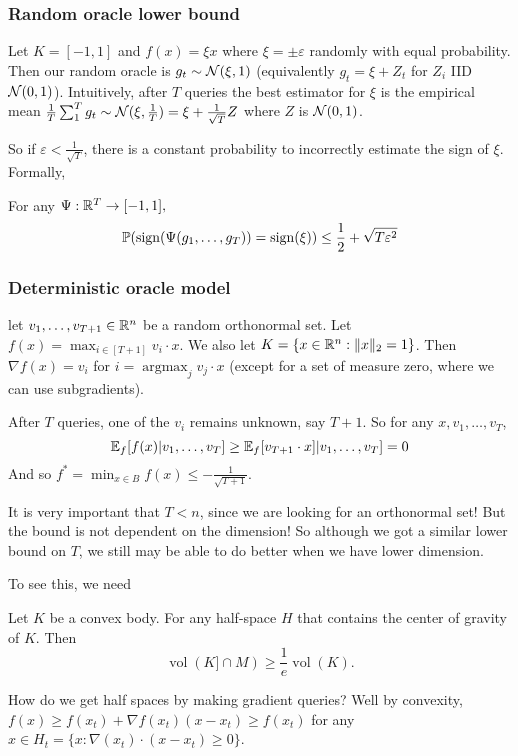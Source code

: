 \documentclass[12pt]{article}
\DeclareMathOperator*{\argmax}{argmax}
\begin{document}
\subsubsection{Random oracle lower bound} 
Let $K=[-1,1]$ and $f(x)=\xi x$ where $\xi=\pm\varepsilon$ randomly with equal probability.
Then our random oracle is $g_t\sim \mathcal{N}(\xi,1)$ (equivalently $g_t=\xi+Z_t$ for $Z_i$ IID $\mathcal{N}(0,1)$). Intuitively, after $T$ queries the best estimator for $\xi$ is the 
empirical mean $\frac{1}{T}\sum_1^T g_t\sim\mathcal{N}(\xi,\frac{1}{T})=\xi+\frac{1}{\sqrt{T}}Z$ where $Z$ is $\mathcal{N}(0,1)$.

So if $\varepsilon<\frac{1}{\sqrt{T}}$, there is a constant probability to incorrectly estimate the sign of $\xi$. Formally,
\begin{lem}
	For any $\Psi:\mathbb{R}^T\to [-1,1],$
	\[\mathbb{P}(\operatorname{sign}(\Psi(g_1,\dots,g_T))=\operatorname{sign}(\xi))\le\frac{1}{2}+\sqrt{T\varepsilon^2}\]
\end{lem}

\subsubsection{Deterministic oracle model} 
let $v_1,\dots,v_{T+1}\in\mathbb{R}^n$ be a random orthonormal set. Let $f(x)=\max_{i\in[T+1]}v_i\cdot x$. We also let $K=\{x\in\mathbb{R}^n:\|x\|_2=1\}$. 
Then $\nabla f(x)=v_i$ for $i=\argmax_{j} v_j\cdot x$ (except for a set of measure zero, where we can use subgradients).

After $T$ queries, one of the $v_i$ remains unknown, say $T+1$. So for any $x, v_1,\dots, v_T$,
\[\mathbb{E}_f[f(x)|v_1,\dots,v_T]\ge\mathbb{E}_f[v_{T+1}\cdot x]|v_1,\dots,v_T]=0\]
And so $f^\ast=\min_{x\in B}f(x)\le-\frac{1}{\sqrt{T+1}}$. 
\begin{rmk}
	It is very important that $T<n$, since we are looking for an orthonormal set! But the bound is not dependent on the dimension! So although we got a similar lower bound on $T$, 
	we still may be able to do better when we have lower dimension.
\end{rmk}

To see this, we need 
\begin{prop}
Let $K$ be a convex body. For any half-space $H$ that contains the center of gravity of $K$. Then 
\[\operatorname{vol}(K]\cap M)\ge\frac{1}{e}\operatorname{vol}(K).\]
\end{prop}

How do we get half spaces by making gradient queries? Well by convexity, $f(x)\ge f(x_t)+\nabla f(x_t)(x-x_t)\ge f(x_t)$ for any $x\in H_t=\{x:\nabla(x_t)\cdot(x-x_t)\ge 0\}$.
\end{document}
